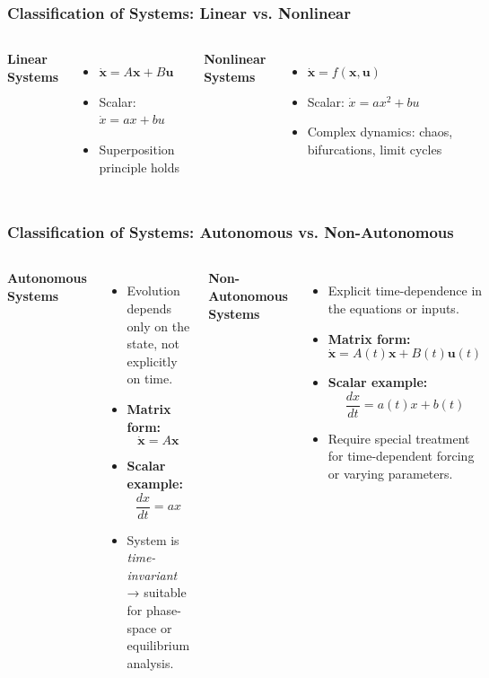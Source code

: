 \documentclass{beamer}
\begin{document}
\begin{frame}
\frametitle{Classification of Systems: Linear vs. Nonlinear}
\begin{columns}[T,onlytextwidth]
    \textbf{Linear Systems}
    \begin{itemize}
        \item \(\dot{\mathbf{x}} = A\mathbf{x} + B\mathbf{u}\)
        \item Scalar: \(\dot{x} = a x + b u\)
        \item Superposition principle holds
    \end{itemize}

    \textbf{Nonlinear Systems}
    \begin{itemize}
        \item \(\dot{\mathbf{x}} = f(\mathbf{x}, \mathbf{u})\)
        \item Scalar: \(\dot{x} = a x^2 + b u\)
        \item Complex dynamics: chaos, bifurcations, limit cycles
    \end{itemize}
\end{columns}
\end{frame}




\begin{frame}
\frametitle{Classification of Systems: Autonomous vs. Non-Autonomous}
\scriptsize
\begin{columns}[T,onlytextwidth]
    \textbf{Autonomous Systems}
    \begin{itemize}
        \item Evolution depends only on the state, not explicitly on time.
        \item \textbf{Matrix form:}
        \[
        \dot{\mathbf{x}} = A\mathbf{x}
        \]
        \item \textbf{Scalar example:}
        \[
        \frac{dx}{dt} = a x
        \]
        \item System is \textit{time-invariant} → suitable for phase-space or equilibrium analysis.
    \end{itemize}

    \textbf{Non-Autonomous Systems}
    \begin{itemize}
        \item Explicit time-dependence in the equations or inputs.
        \item \textbf{Matrix form:}
        \[
        \dot{\mathbf{x}} = A(t)\mathbf{x} + B(t)\mathbf{u}(t)
        \]
        \item \textbf{Scalar example:}
        \[
        \frac{dx}{dt} = a(t) x + b(t)
        \]
        \item Require special treatment for time-dependent forcing or varying parameters.
    \end{itemize}
\end{columns}
\end{frame}
\end{document}
